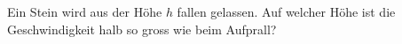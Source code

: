 Ein Stein wird aus der Höhe $h$ fallen gelassen. Auf welcher Höhe ist die Geschwindigkeit halb so gross wie beim Aufprall?
